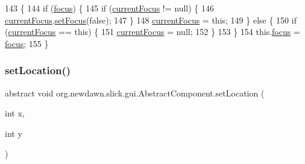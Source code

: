 \begin{DoxyCode}
143                                         \{
144         \textcolor{keywordflow}{if} (\mbox{\hyperlink{classorg_1_1newdawn_1_1slick_1_1gui_1_1_abstract_component_a9a7b67f481728081895d167e792aaa74}{focus}}) \{
145             \textcolor{keywordflow}{if} (\mbox{\hyperlink{classorg_1_1newdawn_1_1slick_1_1gui_1_1_abstract_component_aa30f22e9d9dc79cef2e36d40a4435f0e}{currentFocus}} != null) \{
146                 \mbox{\hyperlink{classorg_1_1newdawn_1_1slick_1_1gui_1_1_abstract_component_aa30f22e9d9dc79cef2e36d40a4435f0e}{currentFocus}}.\mbox{\hyperlink{classorg_1_1newdawn_1_1slick_1_1gui_1_1_abstract_component_a92a19e06c7872abfb02d7e6625f449eb}{setFocus}}(\textcolor{keyword}{false});
147             \}
148             \mbox{\hyperlink{classorg_1_1newdawn_1_1slick_1_1gui_1_1_abstract_component_aa30f22e9d9dc79cef2e36d40a4435f0e}{currentFocus}} = \textcolor{keyword}{this};
149         \} \textcolor{keywordflow}{else} \{
150             \textcolor{keywordflow}{if} (\mbox{\hyperlink{classorg_1_1newdawn_1_1slick_1_1gui_1_1_abstract_component_aa30f22e9d9dc79cef2e36d40a4435f0e}{currentFocus}} == \textcolor{keyword}{this}) \{
151                 \mbox{\hyperlink{classorg_1_1newdawn_1_1slick_1_1gui_1_1_abstract_component_aa30f22e9d9dc79cef2e36d40a4435f0e}{currentFocus}} = null;
152             \}
153         \}
154         this.\mbox{\hyperlink{classorg_1_1newdawn_1_1slick_1_1gui_1_1_abstract_component_a9a7b67f481728081895d167e792aaa74}{focus}} = \mbox{\hyperlink{classorg_1_1newdawn_1_1slick_1_1gui_1_1_abstract_component_a9a7b67f481728081895d167e792aaa74}{focus}};
155     \}
\end{DoxyCode}
\mbox{\label{classorg_1_1newdawn_1_1slick_1_1gui_1_1_abstract_component_a2cc82d8f8d0fddc059af2e60853f085a}} 
\subsubsection{\texorpdfstring{set\+Location()}{setLocation()}}
{\footnotesize\ttfamily abstract void org.\+newdawn.\+slick.\+gui.\+Abstract\+Component.\+set\+Location (\begin{DoxyParamCaption}\item[{int}]{x,  }\item[{int}]{y }\end{DoxyParamCaption})\hspace{0.3cm}{\ttfamily [abstract]}}

